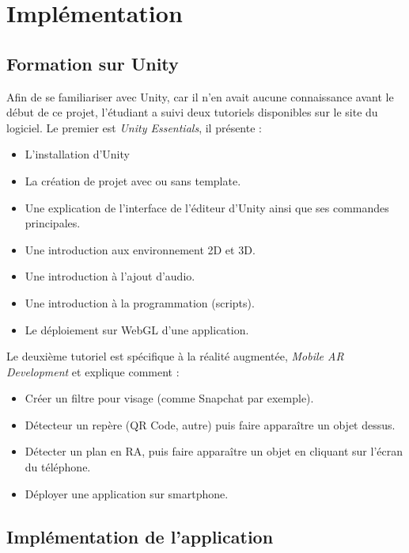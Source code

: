 \chapter{Implémentation}
\section{Formation sur Unity}
Afin de se familiariser avec Unity, car il n'en avait aucune connaissance avant le début de ce projet, l'étudiant a suivi deux tutoriels disponibles
sur le site du logiciel\cite{UnityEssentialsPathway}\Cite{MobileARDevelopment}. Le premier est \textit{Unity Essentials}, il présente :

\begin{itemize}[label={\textbullet}]
    \item L'installation d'Unity
    \item La création de projet avec ou sans template.
    \item Une explication de l'interface de l'éditeur d'Unity ainsi que ses commandes principales.
    \item Une introduction aux environnement 2D et 3D.
    \item Une introduction à l'ajout d'audio.
    \item Une introduction à la programmation (scripts).
    \item Le déploiement sur WebGL d'une application.
\end{itemize}


Le deuxième tutoriel est spécifique à la réalité augmentée, \textit{Mobile AR Development} et explique comment :

\begin{itemize}[label={\textbullet}]
    \item Créer un filtre pour visage (comme Snapchat par exemple).
    \item Détecteur un repère (QR Code, autre) puis faire apparaître un objet dessus.
    \item Détecter un plan en RA, puis faire apparaître un objet en cliquant sur l'écran du téléphone.
    \item Déployer une application sur smartphone.
\end{itemize}
\newpage
\section{Implémentation de l'application}
